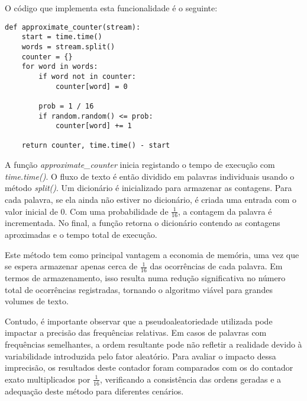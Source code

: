 \documentclass[shortpaper, portugues, times, mirror]{revdetua}
\begin{document}
O código que implementa esta funcionalidade é o seguinte:
\begin{lstlisting}
def approximate_counter(stream):
    start = time.time()
    words = stream.split()
    counter = {}
    for word in words:
        if word not in counter:
            counter[word] = 0

        prob = 1 / 16
        if random.random() <= prob:
            counter[word] += 1

    return counter, time.time() - start
\end{lstlisting}
A função \textit{approximate\_counter} inicia registando o tempo de execução com \textit{time.time()}. O fluxo de texto é então dividido em palavras individuais usando o método \textit{split()}. Um dicionário é inicializado para armazenar as contagens. Para cada palavra, se ela ainda não estiver no dicionário, é criada uma entrada com o valor inicial de 0. Com uma probabilidade de \( \frac{1}{16} \), a contagem da palavra é incrementada. No final, a função retorna o dicionário contendo as contagens aproximadas e o tempo total de execução.

Este método tem como principal vantagem a economia de memória, uma vez que se espera armazenar apenas cerca de \( \frac{1}{16} \) das ocorrências de cada palavra. Em termos de armazenamento, isso resulta numa redução significativa no número total de ocorrências registradas, tornando o algoritmo viável para grandes volumes de texto.

Contudo, é importante observar que a pseudoaleatoriedade utilizada pode impactar a precisão das frequências relativas. Em casos de palavras com frequências semelhantes, a ordem resultante pode não refletir a realidade devido à variabilidade introduzida pelo fator aleatório. Para avaliar o impacto dessa imprecisão, os resultados deste contador foram comparados com os do contador exato multiplicados por \( \frac{1}{16} \), verificando a consistência das ordens geradas e a adequação deste método para diferentes cenários.
\end{document}
